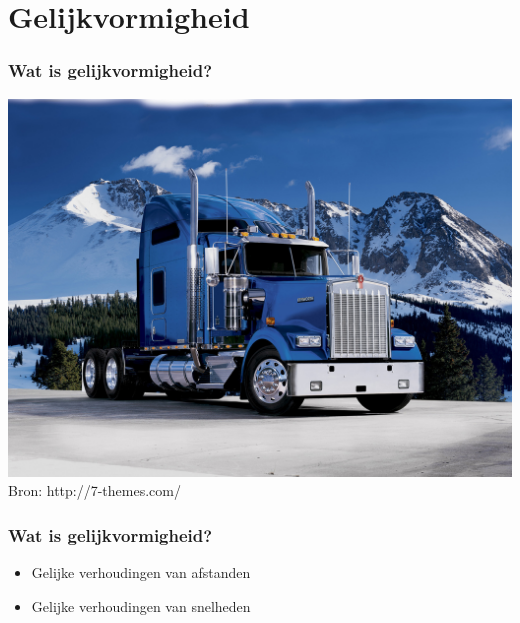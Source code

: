 \documentclass[t]{beamer}
\begin{document}
	\section{Gelijkvormigheid}	
  	\begin{frame}
		\frametitle{Wat is gelijkvormigheid?}

		\centering
		\includegraphics[height=0.8\textheight]{../fig/gelijkvormigheid/6931636-kenworth-w900-wallpaper-hd.jpg}\\
		\footnotesize{Bron: http://7-themes.com/}
  	\end{frame}
  	\begin{frame}
		\frametitle{Wat is gelijkvormigheid?}
		
		\begin{itemize}
			\item<2-3> Gelijke verhoudingen van afstanden
			\item<3-3> Gelijke verhoudingen van snelheden
		\end{itemize}

        \vspace{0.1cm}
               
		
  	\end{frame}
\end{document}
